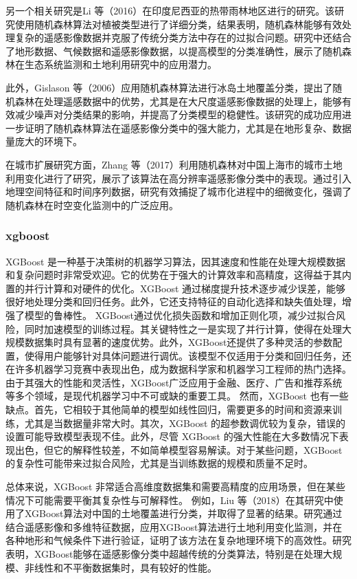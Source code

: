 \documentclass{article}
\begin{document}
	另一个相关研究是Li 等（2016）在印度尼西亚的热带雨林地区进行的研究。该研究使用随机森林算法对植被类型进行了详细分类，结果表明，随机森林能够有效处理复杂的遥感影像数据并克服了传统分类方法中存在的过拟合问题\cite{li2016}。研究中还结合了地形数据、气候数据和遥感影像数据，以提高模型的分类准确性，展示了随机森林在生态系统监测和土地利用研究中的应用潜力。
	
	此外，Gislason 等（2006）应用随机森林算法进行冰岛土地覆盖分类，提出了随机森林在处理遥感数据中的优势，尤其是在大尺度遥感影像数据的处理上，能够有效减少噪声对分类结果的影响，并提高了分类模型的稳健性\cite{gislason2006}。该研究的成功应用进一步证明了随机森林算法在遥感影像分类中的强大能力，尤其是在地形复杂、数据量庞大的环境下。
	
	在城市扩展研究方面，Zhang 等（2017）利用随机森林对中国上海市的城市土地利用变化进行了研究，展示了该算法在高分辨率遥感影像分类中的表现\cite{zhang2017}。通过引入地理空间特征和时间序列数据，研究有效捕捉了城市化进程中的细微变化，强调了随机森林在时空变化监测中的广泛应用。
	
	\subsubsection{xgboost}
	XGBoost 是一种基于决策树的机器学习算法，因其速度和性能在处理大规模数据和复杂问题时非常受欢迎。它的优势在于强大的计算效率和高精度，这得益于其内置的并行计算和对硬件的优化。XGBoost 通过梯度提升技术逐步减少误差，能够很好地处理分类和回归任务。此外，它还支持特征的自动化选择和缺失值处理，增强了模型的鲁棒性。
	XGBoost通过优化损失函数和增加正则化项，减少过拟合风险，同时加速模型的训练过程。其关键特性之一是实现了并行计算，使得在处理大规模数据集时具有显著的速度优势。此外，XGBoost还提供了多种灵活的参数配置，使得用户能够针对具体问题进行调优。该模型不仅适用于分类和回归任务，还在许多机器学习竞赛中表现出色，成为数据科学家和机器学习工程师的热门选择。由于其强大的性能和灵活性，XGBoost广泛应用于金融、医疗、广告和推荐系统等多个领域，是现代机器学习中不可或缺的重要工具。
	然而，XGBoost 也有一些缺点。首先，它相较于其他简单的模型如线性回归，需要更多的时间和资源来训练，尤其是当数据量非常大时。其次，XGBoost 的超参数调优较为复杂，错误的设置可能导致模型表现不佳。此外，尽管 XGBoost 的强大性能在大多数情况下表现出色，但它的解释性较差，不如简单模型容易解读。对于某些问题，XGBoost 的复杂性可能带来过拟合风险，尤其是当训练数据的规模和质量不足时。
	
	
	总体来说，XGBoost 非常适合高维度数据集和需要高精度的应用场景，但在某些情况下可能需要平衡其复杂性与可解释性。
		例如，Liu 等（2018）在其研究中使用了XGBoost算法对中国的土地覆盖进行分类，并取得了显著的结果\cite{liu2018}。研究通过结合遥感影像和多维特征数据，应用XGBoost算法进行土地利用变化监测，并在各种地形和气候条件下进行验证，证明了该方法在复杂地理环境下的高效性。研究表明，XGBoost能够在遥感影像分类中超越传统的分类算法，特别是在处理大规模、非线性和不平衡数据集时，具有较好的性能。
		
\end{document}
